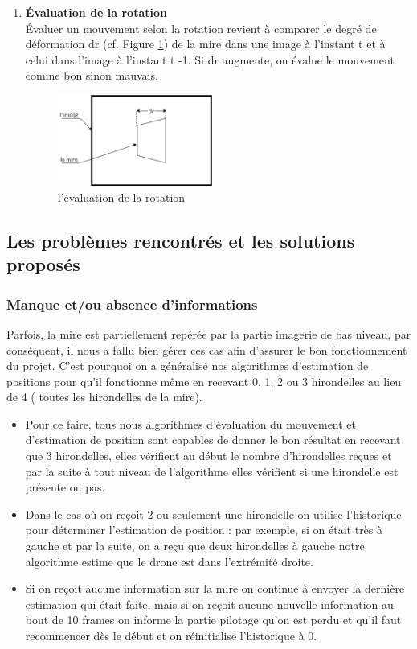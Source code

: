 \documentclass[12pt]{article}
\begin{document}
\begin{enumerate}
        \item\textbf{Évaluation de la rotation }\\
         Évaluer un mouvement selon la rotation revient à comparer le degré de déformation dr (cf. Figure \ref{fig:image16})
        de la mire dans une image à l’instant t et à celui dans l’image à l’instant t -1. Si dr augmente, on évalue le mouvement comme bon sinon mauvais.\\
        \begin{figure}[H]
        \centering
        \includegraphics[height=3cm]{image16.png}
        \caption{l'évaluation de la rotation}
        \label{fig:image16}
        \end{figure}
        \end{enumerate}
  
  
   
\subsection{Les problèmes rencontrés et les solutions proposés}
\subsubsection{Manque et/ou absence d'informations}
  Parfois, la mire est partiellement repérée par la partie imagerie de bas niveau, par conséquent, il nous a fallu bien gérer ces cas afin d’assurer le bon fonctionnement du projet. C’est pourquoi on a généralisé nos algorithmes d’estimation de positions pour qu’il fonctionne même en recevant 0, 1, 2 ou 3 hirondelles au lieu de 4 ( toutes les hirondelles de la mire).


  
   \begin{itemize}
    \item Pour ce faire, tous nous algorithmes d'évaluation du mouvement et d’estimation de position sont capables de donner le bon résultat en recevant que 3 hirondelles, elles vérifient au début le nombre d’hirondelles reçues et par la suite à tout niveau de l’algorithme elles vérifient si une hirondelle est présente ou pas.
    \item Dans le cas où on reçoit 2 ou seulement une hirondelle on utilise l'historique pour déterminer l’estimation de position : par exemple, si on était très à gauche et par la suite, on a reçu que deux hirondelles à gauche notre algorithme estime que le drone est dans l'extrémité droite.
    \item Si on reçoit aucune information sur la mire on continue à envoyer la dernière estimation qui était faite, mais si on reçoit aucune nouvelle information au bout de 10 frames on informe la partie pilotage qu’on est perdu et qu’il faut recommencer dès le début et on réinitialise l'historique à 0.
    \end{itemize}
    
\end{document}
